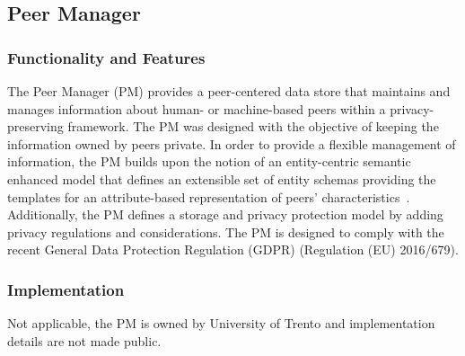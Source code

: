 \subsection{Peer Manager}
\subsubsection{Functionality and Features}
The Peer Manager (PM) provides a peer-centered data store that maintains and manages information about human- or machine-based peers within a privacy-preserving framework.
The PM was designed with the objective of keeping the information owned by peers private. In order to provide a flexible management of information, the PM builds upon the notion of an entity-centric semantic enhanced model that defines an extensible set of entity schemas providing the templates for an attribute-based representation of peers’ characteristics~\cite{D4.2}. Additionally, the PM defines a storage and privacy protection model by adding privacy regulations and considerations. The PM is designed to comply with the recent General Data Protection Regulation (GDPR) (Regulation (EU) 2016/679).
\subsubsection{Implementation}
Not applicable, the PM is owned by University of Trento and implementation details are not made public.
